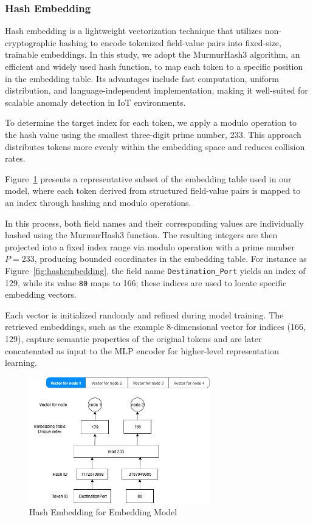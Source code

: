 \begin{ZhChapter}
    \subsubsection{Hash Embedding} %
    Hash embedding is a lightweight vectorization technique that utilizes non-cryptographic hashing to encode tokenized field-value pairs into fixed-size, trainable embeddings. In this study, we adopt the MurmurHash3 algorithm, an efficient and widely used hash function, to map each token to a specific position in the embedding table. Its advantages include fast computation, uniform distribution, and language-independent implementation, making it well-suited for scalable anomaly detection in IoT environments.

    To determine the target index for each token, we apply a modulo operation to the hash value using the smallest three-digit prime number, 233. This approach distributes tokens more evenly within the embedding space and reduces collision rates.

    Figure~\ref{fig:EmbeddingFlow} presents a representative subset of the embedding table used in our model, where each token derived from structured field-value pairs is mapped to an index through hashing and modulo operations.

    In this process, both field names and their corresponding values are individually hashed using the MurmurHash3 function. The resulting integers are then projected into a fixed index range via modulo operation with a prime number \(P=233\), producing bounded coordinates in the embedding table. For instance as Figure~\ref{fig:hashembedding}, the field name \texttt{Destination\_Port} yields an index of 129, while its value \texttt{80} maps to 166; these indices are used to locate specific embedding vectors.

    Each vector is initialized randomly and refined during model training. The retrieved embeddings, such as the example 8-dimensional vector for indices (166, 129), capture semantic properties of the original tokens and are later concatenated as input to the MLP encoder for higher-level representation learning.

    \begin{figure}[htbp]
        \centering
        \includegraphics[width = 0.7\textwidth]{image/EmbeddingFlow.jpg}
        \caption{Hash Embedding for Embedding Model}
        \label{fig:EmbeddingFlow}
    \end{figure}





\end{ZhChapter}

